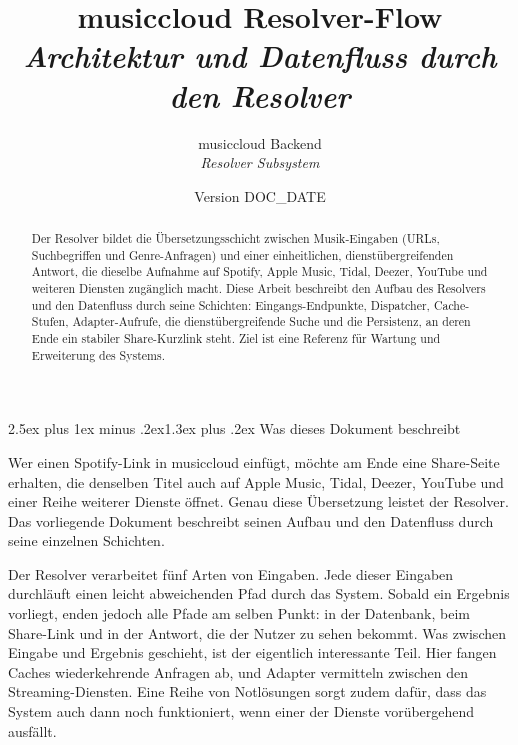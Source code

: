 \documentclass[11pt,a4paper]{article}
\title{%
  {\bfseries musiccloud Resolver-Flow}\\[0.55em]
  {\Large\mdseries\itshape Architektur und Datenfluss durch den Resolver}%
}
\author{%
  musiccloud Backend\\[0.2em]
  \small\itshape Resolver Subsystem
}
\date{\small Version \code{DOC\_VERSION}\quad\textperiodcentered\quad DOC\_DATE}
\makeatletter
\renewcommand{\section}{\@startsection{section}{1}{0pt}%
  {2.5ex plus 1ex minus .2ex}{1.3ex plus .2ex}%
  {\Large\bfseries\itshape}}
\makeatother
\begin{document}
\maketitle

\begin{abstract}
\noindent
Der Resolver bildet die Übersetzungsschicht zwischen Musik-Eingaben
(URLs, Suchbegriffen und Genre-Anfragen) und einer einheitlichen,
dienstübergreifenden Antwort, die dieselbe Aufnahme auf Spotify, Apple
Music, Tidal, Deezer, YouTube und weiteren Diensten zugänglich macht.
Diese Arbeit beschreibt den Aufbau des Resolvers und den Datenfluss
durch seine Schichten: Eingangs-Endpunkte, Dispatcher, Cache-Stufen,
Adapter-Aufrufe, die dienstübergreifende Suche und die Persistenz, an
deren Ende ein stabiler Share-Kurzlink steht. Ziel ist eine Referenz
für Wartung und Erweiterung des Systems.
\end{abstract}

\vspace{0.6em}

\vspace{1em}
\tableofcontents
\clearpage

\section{Was dieses Dokument beschreibt}

Wer einen Spotify-Link in musiccloud einfügt, möchte am Ende eine
Share-Seite erhalten, die denselben Titel auch auf Apple Music,
Tidal, Deezer, YouTube und einer Reihe weiterer Dienste öffnet.
Genau diese Übersetzung leistet der Resolver. Das vorliegende
Dokument beschreibt seinen Aufbau und den Datenfluss durch seine
einzelnen Schichten.

Der Resolver verarbeitet fünf Arten von Eingaben.
Jede dieser Eingaben durchläuft einen leicht abweichenden Pfad
durch das System. Sobald ein Ergebnis vorliegt, enden jedoch alle
Pfade am selben Punkt: in der Datenbank, beim Share-Link und in
der Antwort, die der Nutzer zu sehen bekommt. Was zwischen Eingabe
und Ergebnis geschieht, ist der eigentlich interessante Teil. Hier
fangen Caches wiederkehrende Anfragen ab, und Adapter vermitteln
zwischen den Streaming-Diensten. Eine Reihe von Notlösungen sorgt
zudem dafür, dass das System auch dann noch funktioniert, wenn
einer der Dienste vorübergehend ausfällt.
\end{document}
